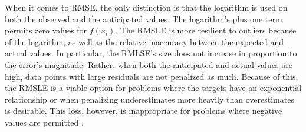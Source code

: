 \documentclass[nobib]{tufte-handout} %
\begin{document}
\begin{enumerate}
     When it comes to RMSE, the only distinction is that the logarithm is used on both the observed and the anticipated values. The logarithm's plus one term permits zero values for $f(x_i)$. The RMSLE is more resilient to outliers because of the logarithm, as well as the relative inaccuracy between the expected and actual values. In particular, the RMLSE's size does not increase in proportion to the error's magnitude. Rather, when both the anticipated and actual values are high, data points with large residuals are not penalized as much. Because of this, the RMSLE is a viable option for problems where the targets have an exponential relationship or when penalizing underestimates more heavily than overestimates is desirable. This loss, however, is inappropriate for problems where negative values are permitted \citep{ciampiconi2023survey}.
  \end{enumerate}
\end{document}
